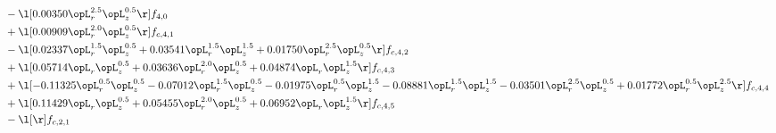 \begin{alignat}{2}
& - \l[  0.00350 \opL_r^{2.5} \opL_z^{0.5}  \r] f_{4,0} \nonumber \\ 
& + \l[  0.00909 \opL_r^{2.0} \opL_z^{0.5}  \r] f_{c,4,1} \nonumber \\ 
& - \l[  0.02337 \opL_r^{1.5} \opL_z^{0.5} +  0.03541 \opL_r^{1.5} \opL_z^{1.5} +  0.01750 \opL_r^{2.5} \opL_z^{0.5}  \r] f_{c,4,2} \nonumber \\ 
& + \l[  0.05714 \opL_r \opL_z^{0.5} +  0.03636 \opL_r^{2.0} \opL_z^{0.5} +  0.04874 \opL_r \opL_z^{1.5}  \r] f_{c,4,3} \nonumber \\ 
& + \l[  -0.11325 \opL_r^{0.5} \opL_z^{0.5}   -0.07012 \opL_r^{1.5} \opL_z^{0.5}   -0.01975 \opL_r^{0.5} \opL_z^{1.5}   -0.08881 \opL_r^{1.5} \opL_z^{1.5}   -0.03501 \opL_r^{2.5} \opL_z^{0.5} +  0.01772 \opL_r^{0.5} \opL_z^{2.5}  \r] f_{c,4,4} \nonumber \\ 
& + \l[  0.11429 \opL_r \opL_z^{0.5} +  0.05455 \opL_r^{2.0} \opL_z^{0.5} +  0.06952 \opL_r \opL_z^{1.5}  \r] f_{c,4,5} \nonumber \\ 
& - \l[  \r] f_{c,2,1} \nonumber \\ 
\end{alignat} 


